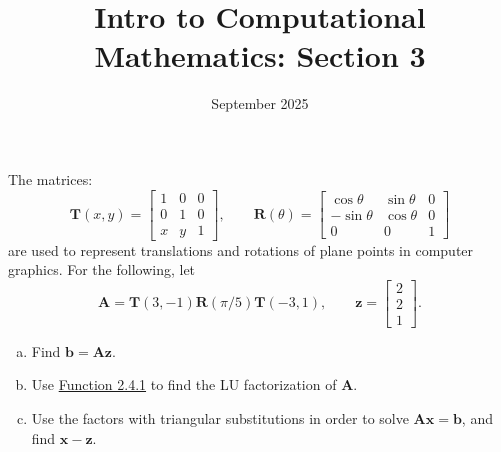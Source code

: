 \documentclass{article}
\title{Intro to Computational Mathematics: Section 3}
\date{September 2025}
\renewcommand{\vec}[1]{\mathbf{#1}}
\newenvironment{problem}[2][Problem]{\begin{trivlist}
\item[\hskip \labelsep {\bfseries #1}\hskip \labelsep {\bfseries #2.}]}{\end{trivlist}}
\theoremstyle{definition}
\begin{document}
\maketitle



\begin{problem}{2.4.2}
    The matrices:
    $$\mathbf{T}(x, y) = \begin{bmatrix*}1 & 0 & 0\\0 & 1 & 0\\x & y & 1\end{bmatrix*},\qquad \mathbf{R}(\theta) = \begin{bmatrix*}\cos\theta & \sin\theta & 0\\-\sin\theta & \cos\theta & 0\\0 & 0 & 1\end{bmatrix*}$$
    are used to represent translations and rotations of plane points in computer graphics. For the following, let
    $$\mathbf{A} = \mathbf{T}(3, -1)\mathbf{R}(\pi/5)\mathbf{T}(-3, 1), \qquad \vec{z} = \begin{bmatrix*}2\\2\\1\end{bmatrix*}.$$
    \begin{enumerate}[(a)]
        \item Find $\vec{b} = \mathbf{A}\vec{z}$.
        \item Use \href{https://fncbook.com/lu/#function-lufact}{Function 2.4.1} to find the LU factorization of $\mathbf{A}$.
        \item Use the factors with triangular substitutions in order to solve $\mathbf{A}\vec{x} = \vec{b}$, and find $\vec{x} - \vec{z}$.
    \end{enumerate}
\end{problem}
\end{document}
